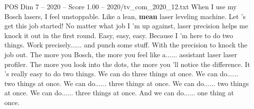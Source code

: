 \begin{textsample}{POS Dim 7 – 2020 – Score 1.00 – 2020/tv\_com\_2020\_12.txt}  \label{ex:f7_pos_086}
When I use my Bosch lasers, I feel unstoppable.
Like a lean, \textbf{mean} laser leveling machine.
Let 's get this job started!
No matter what job I 'm up against, laser precision helps me knock it out in the first round.
Easy, easy, easy.
Because I 'm here to do two things.
Work precisely...... and punch some stuff.
With the precision to knock the job out.
The more you Bosch, the more you feel like a...... assistant laser laser profiler.
The more you look into the dots, the more you 'll notice the difference.
It 's really easy to do two things.
We can do three things at once.
We can do...... two things at once.
We can do...... three things at once.
We can do...... two things at once.
We can do...... three things at once.
And we can do...... one thing at once.

\end{textsample}
